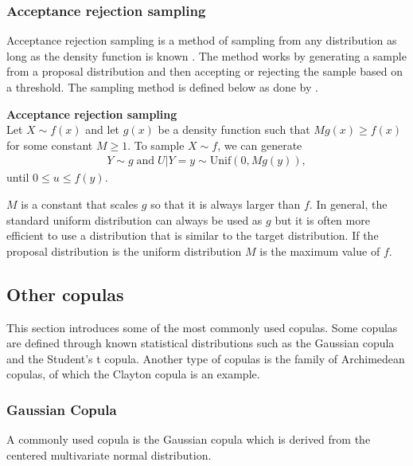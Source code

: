 
\subsubsection{Acceptance rejection sampling}\label{sec:AcceptanceRejection} 
Acceptance rejection sampling is a method of sampling from any distribution as long as the density function is known . The method works by generating a sample from a proposal distribution and then accepting or rejecting the sample based on a threshold. The sampling method is defined below as done by .

\begin{definition}
    \textbf{Acceptance rejection sampling}\\
    Let $X \sim f(x)$ and let $g(x)$ be a density function such that $M g(x) \geq f(x)$ for some constant $M \geq 1$. To sample $X \sim f$, we can generate   
    \begin{align*}
        Y \sim g \; \mathrm{and} \; U|Y = y \sim \mathrm{Unif}(0,Mg(y)),      
    \end{align*}
    until $0 \leq u \leq f(y)$.
\end{definition}
$M$ is a constant that scales $g$ so that it is always larger than $f$. In general, the standard uniform distribution can always be used as $g$ but it is often more efficient to use a distribution that is similar to the target distribution. If the proposal distribution is the uniform distribution $M$ is the maximum value of $f$.  

\subsection{Other copulas}
This section introduces some of the most commonly used copulas. Some copulas are defined through known statistical distributions such as the Gaussian copula and the Student's t copula. Another type of copulas is the family of Archimedean copulas, of which the Clayton copula is an example.

\subsubsection{Gaussian Copula}\label{sec:GaussianCopula}
A commonly used copula is the Gaussian copula which is derived from the centered multivariate normal distribution. 


